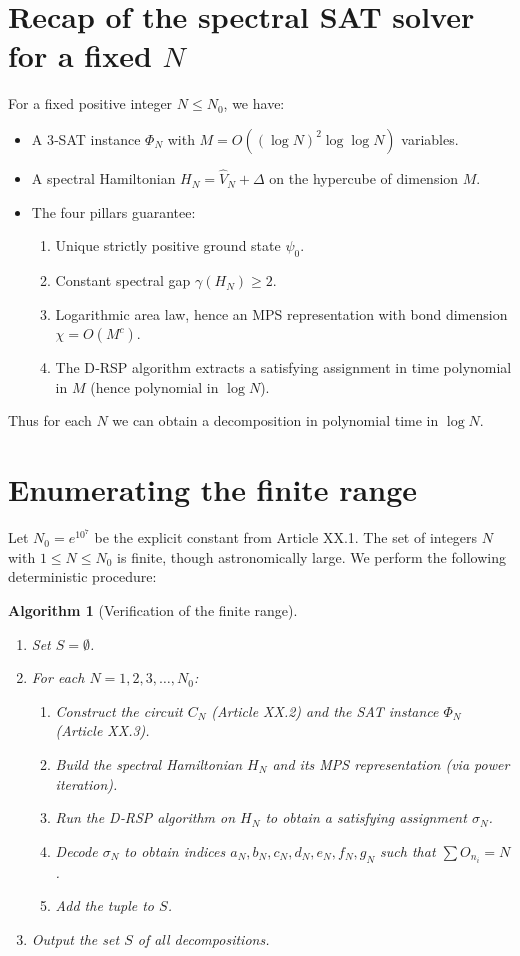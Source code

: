 \documentclass[11pt,a4paper]{article}
\newtheorem{algorithm}{Algorithm}[section]
\begin{document}
\section{Recap of the spectral SAT solver for a fixed \(N\)}

For a fixed positive integer \(N\le N_0\), we have:
\begin{itemize}
\item A 3‑SAT instance \(\Phi_N\) with \(M = O((\log N)^2 \log \log N)\) variables.
\item A spectral Hamiltonian \(H_N = \hat{V}_N + \Delta\) on the hypercube of dimension \(M\).
\item The four pillars guarantee:
  \begin{enumerate}
  \item Unique strictly positive ground state \(\psi_0\).
  \item Constant spectral gap \(\gamma(H_N) \ge 2\).
  \item Logarithmic area law, hence an MPS representation with bond dimension \(\chi = O(M^c)\).
  \item The D‑RSP algorithm extracts a satisfying assignment in time polynomial in \(M\) (hence polynomial in \(\log N\)).
  \end{enumerate}
\end{itemize}
Thus for each \(N\) we can obtain a decomposition in polynomial time in \(\log N\).

\section{Enumerating the finite range}

Let \(N_0 = e^{10^7}\) be the explicit constant from Article XX.1. The set of integers \(N\) with \(1\le N\le N_0\) is finite, though astronomically large. We perform the following deterministic procedure:

\begin{algorithm}[Verification of the finite range]\label{alg:range}
\begin{enumerate}
\item Set \(S = \emptyset\).
\item For each \(N = 1,2,3,\dots, N_0\):
   \begin{enumerate}
   \item Construct the circuit \(C_N\) (Article XX.2) and the SAT instance \(\Phi_N\) (Article XX.3).
   \item Build the spectral Hamiltonian \(H_N\) and its MPS representation (via power iteration).
   \item Run the D‑RSP algorithm on \(H_N\) to obtain a satisfying assignment \(\sigma_N\).
   \item Decode \(\sigma_N\) to obtain indices \(a_N,b_N,c_N,d_N,e_N,f_N,g_N\) such that \(\sum O_{n_i}=N\).
   \item Add the tuple to \(S\).
   \end{enumerate}
\item Output the set \(S\) of all decompositions.
\end{enumerate}
\end{algorithm}
\end{document}
